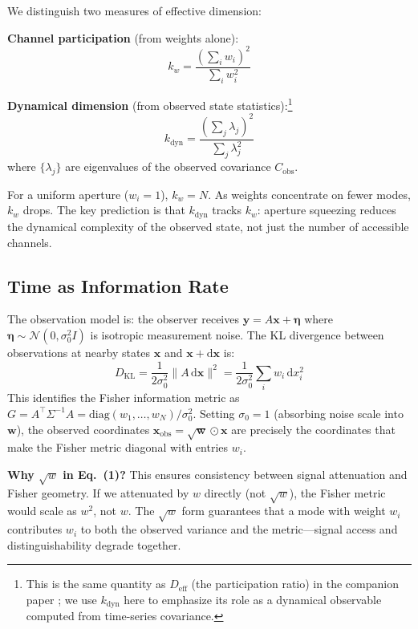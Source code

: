 \documentclass[11pt,a4paper]{article}
\begin{document}
We distinguish two measures of effective dimension:

\textbf{Channel participation} (from weights alone):
\begin{equation}
    k_{w} = \frac{(\sum_i w_i)^2}{\sum_i w_i^2}
\end{equation}

\textbf{Dynamical dimension} (from observed state statistics):\footnote{This is the same quantity as $D_{\mathrm{eff}}$ (the participation ratio) in the companion paper \cite{todd2025infodynamics}; we use $k_{\mathrm{dyn}}$ here to emphasize its role as a dynamical observable computed from time-series covariance.}
\begin{equation}
    k_{\mathrm{dyn}} = \frac{(\sum_j \lambda_j)^2}{\sum_j \lambda_j^2}
\end{equation}
where $\{\lambda_j\}$ are eigenvalues of the observed covariance $C_{\mathrm{obs}}$.

For a uniform aperture ($w_i = 1$), $k_w = N$. As weights concentrate on fewer modes, $k_w$ drops. The key prediction is that $k_{\mathrm{dyn}}$ tracks $k_w$: aperture squeezing reduces the dynamical complexity of the observed state, not just the number of accessible channels.

\subsection{Time as Information Rate}

The observation model is: the observer receives $\mathbf{y} = A\mathbf{x} + \boldsymbol{\eta}$ where $\boldsymbol{\eta} \sim \mathcal{N}(0, \sigma_0^2 I)$ is isotropic measurement noise. The KL divergence between observations at nearby states $\mathbf{x}$ and $\mathbf{x} + \mathrm{d}\mathbf{x}$ is:
\begin{equation}
    D_{\mathrm{KL}} = \frac{1}{2\sigma_0^2} \|A\,\mathrm{d}\mathbf{x}\|^2 = \frac{1}{2\sigma_0^2} \sum_i w_i \,\mathrm{d}x_i^2
\end{equation}
This identifies the Fisher information metric as $G = A^\top \Sigma^{-1} A = \mathrm{diag}(w_1, \ldots, w_N)/\sigma_0^2$. Setting $\sigma_0 = 1$ (absorbing noise scale into $\mathbf{w}$), the observed coordinates $\mathbf{x}_{\mathrm{obs}} = \sqrt{\mathbf{w}} \odot \mathbf{x}$ are precisely the coordinates that make the Fisher metric diagonal with entries $w_i$.

\textbf{Why $\sqrt{w}$ in Eq.~(1)?} This ensures consistency between signal attenuation and Fisher geometry. If we attenuated by $w$ directly (not $\sqrt{w}$), the Fisher metric would scale as $w^2$, not $w$. The $\sqrt{w}$ form guarantees that a mode with weight $w_i$ contributes $w_i$ to both the observed variance and the metric---signal access and distinguishability degrade together.
\end{document}
